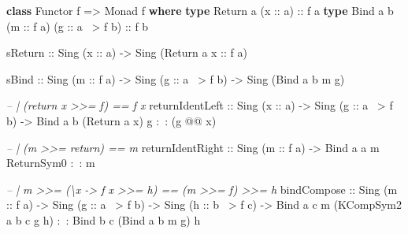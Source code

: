 \documentclass[]{article}
\newenvironment{Shaded}{}{}
\newcommand{\CommentTok}[1]{\textcolor[rgb]{0.38,0.63,0.69}{\textit{#1}}}
\newcommand{\DataTypeTok}[1]{\textcolor[rgb]{0.56,0.13,0.00}{#1}}
\newcommand{\FunctionTok}[1]{\textcolor[rgb]{0.02,0.16,0.49}{#1}}
\newcommand{\KeywordTok}[1]{\textcolor[rgb]{0.00,0.44,0.13}{\textbf{#1}}}
\newcommand{\NormalTok}[1]{#1}
\newcommand{\OtherTok}[1]{\textcolor[rgb]{0.00,0.44,0.13}{#1}}
\begin{document}
\begin{Shaded}
\begin{Highlighting}[]
\KeywordTok{class} \DataTypeTok{Functor}\NormalTok{ f }\OtherTok{=>} \DataTypeTok{Monad}\NormalTok{ f }\KeywordTok{where}
    \KeywordTok{type} \DataTypeTok{Return}\NormalTok{ a   (}\OtherTok{x ::}\NormalTok{ a)}\OtherTok{                   ::}\NormalTok{ f a}
    \KeywordTok{type} \DataTypeTok{Bind}\NormalTok{   a b (}\OtherTok{m ::}\NormalTok{ f a) (}\OtherTok{g ::}\NormalTok{ a }\FunctionTok{~>}\NormalTok{ f b)}\OtherTok{ ::}\NormalTok{ f b}

\NormalTok{    sReturn}
\OtherTok{        ::} \DataTypeTok{Sing}\NormalTok{ (}\OtherTok{x ::}\NormalTok{ a)}
        \OtherTok{->} \DataTypeTok{Sing}\NormalTok{ (}\DataTypeTok{Return}\NormalTok{ a}\OtherTok{ x ::}\NormalTok{ f a)}

\NormalTok{    sBind}
\OtherTok{        ::} \DataTypeTok{Sing}\NormalTok{ (}\OtherTok{m ::}\NormalTok{ f a)}
        \OtherTok{->} \DataTypeTok{Sing}\NormalTok{ (}\OtherTok{g ::}\NormalTok{ a }\FunctionTok{~>}\NormalTok{ f b)}
        \OtherTok{->} \DataTypeTok{Sing}\NormalTok{ (}\DataTypeTok{Bind}\NormalTok{ a b m g)}

    \CommentTok{-- | (return x >>= f) == f x}
\NormalTok{    returnIdentLeft}
\OtherTok{        ::} \DataTypeTok{Sing}\NormalTok{ (}\OtherTok{x ::}\NormalTok{ a)}
        \OtherTok{->} \DataTypeTok{Sing}\NormalTok{ (}\OtherTok{g ::}\NormalTok{ a }\FunctionTok{~>}\NormalTok{ f b)}
        \OtherTok{->} \DataTypeTok{Bind}\NormalTok{ a b (}\DataTypeTok{Return}\NormalTok{ a x) g }\FunctionTok{:~:}\NormalTok{ (g }\FunctionTok{@@}\NormalTok{ x)}

    \CommentTok{-- | (m >>= return) == m}
\NormalTok{    returnIdentRight}
\OtherTok{        ::} \DataTypeTok{Sing}\NormalTok{ (}\OtherTok{m ::}\NormalTok{ f a)}
        \OtherTok{->} \DataTypeTok{Bind}\NormalTok{ a a m }\DataTypeTok{ReturnSym0} \FunctionTok{:~:}\NormalTok{ m}

    \CommentTok{-- | m >>= (\textbackslash{}x -> f x >>= h) == (m >>= f) >>= h}
\NormalTok{    bindCompose}
\OtherTok{        ::} \DataTypeTok{Sing}\NormalTok{ (}\OtherTok{m ::}\NormalTok{ f a)}
        \OtherTok{->} \DataTypeTok{Sing}\NormalTok{ (}\OtherTok{g ::}\NormalTok{ a }\FunctionTok{~>}\NormalTok{ f b)}
        \OtherTok{->} \DataTypeTok{Sing}\NormalTok{ (}\OtherTok{h ::}\NormalTok{ b }\FunctionTok{~>}\NormalTok{ f c)}
        \OtherTok{->} \DataTypeTok{Bind}\NormalTok{ a c m (}\DataTypeTok{KCompSym2}\NormalTok{ a b c g h) }\FunctionTok{:~:} \DataTypeTok{Bind}\NormalTok{ b c (}\DataTypeTok{Bind}\NormalTok{ a b m g) h}


\end{Highlighting}
\end{Shaded}
\end{document}
